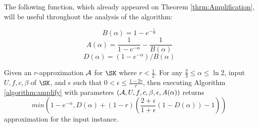 The following function, which already appeared on Theorem \ref{thrm:Amplification}, will be useful throughout the analysis of the algorithm:

$$ B(\alpha)=1-e^{-\frac{1}{\alpha}}$$
$$ A(\alpha) = \frac{1}{1-e^{-\alpha}}-\frac{1}{B(\alpha)}$$
 $$D(\alpha)=(1-e^{-\alpha})/B(\alpha)$$
 
 \begin{lemma}
 	\label{lemma:amplification}
 	Given an $r$-approximation $\mathcal{A}$ for $\SK$ where $r<\frac{1}{2}$.
 	For any $\frac{2}{3}\leq \alpha \leq  \ln 2$, input $U,f,c,\beta$ of $\SK$, 
 	and $\epsilon$ such that $0<\epsilon\leq \frac{1-2r}{r}$, then executing 
 	Algorithm \ref{algorithm:amplify}  with parameters 
 	$(\mathcal{A}, U, f, c, \beta, \epsilon, A(\alpha))$ returns
 	$$min\left(1-e^{-\alpha}, D(\alpha) + (1-r) \left( \frac{2+\epsilon}{1+\epsilon}(1- D(\alpha)) -1 \right) \right)$$
 	approximation for the input instance. 
 \end{lemma}




